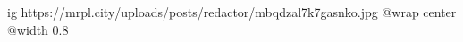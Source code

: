  
 
 
 
 

\ifcmt
  ig https://mrpl.city/uploads/posts/redactor/mbqdzal7k7gasnko.jpg
  @wrap center
  @width 0.8
\fi
